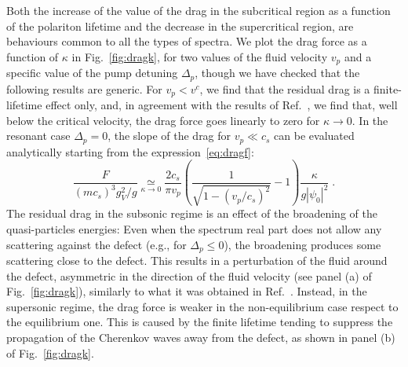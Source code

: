 Both the increase of the value of the drag in the subcritical region
as a function of the polariton lifetime and the decrease in the
supercritical region, are behaviours common to all the types of
spectra. We plot the drag force as a function of $\kappa$ in
Fig.~\ref{fig:dragk}, for two values of the fluid velocity $v_p$ and a
specific value of the pump detuning $\Delta_p$, though we have checked
that the following results are generic. For $v_p < v^c$, we find that
the residual drag is a finite-lifetime effect only, and, in agreement
with the results of Ref.~\cite{Cancellieri_2010}, we find that, well
below the critical velocity, the drag force goes linearly to zero for
$\kappa \to 0$. In the resonant case $\Delta_p=0$, the slope of the
drag for $v_p \ll c_s$ can be evaluated analytically starting from the
expression~\eqref{eq:dragf}:
%
\begin{equation*}
    \frac{F}{(mc_s)^3 g_V^2/g} \mathop{\simeq}\limits_{\kappa \to 0} \frac{2 c_s}{\pi
      v_p} \left( \frac{1}{ \sqrt{1-(v_p/c_s)^2}} - 1 \right)
    \frac{\kappa}{g |\psi_0|^2} \; .
\end{equation*}
%
The residual drag in the subsonic regime is an effect of the
broadening of the quasi-particles energies: Even when the spectrum
real part does not allow any scattering against the defect (e.g., for
$\Delta_p \le 0$), the broadening produces some scattering close to
the defect. This results in a perturbation of the fluid around the
defect, asymmetric in the direction of the fluid velocity (see panel
(a) of Fig.~\ref{fig:dragk}), similarly to what it was obtained in
Ref.~\cite{Cancellieri_2010}. Instead, in the supersonic regime, the
drag force is weaker in the non-equilibrium case respect to the
equilibrium one. This is caused by the finite lifetime tending to
suppress the propagation of the Cherenkov waves away from the defect,
as shown in panel (b) of Fig.~\ref{fig:dragk}.




